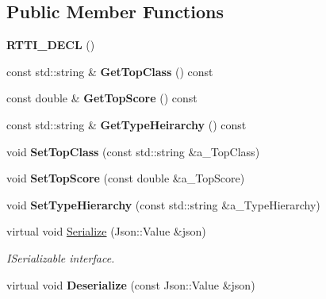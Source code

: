 \subsection*{Public Member Functions}
\begin{DoxyCompactItemize}
\item 
\mbox{\label{class_entity_aaf469281c2b86495bf400362eda6ef57}} 
{\bfseries R\+T\+T\+I\+\_\+\+D\+E\+CL} ()
\item 
\mbox{\label{class_entity_aa4b1144ee0a85240c58268bab6a02636}} 
const std\+::string \& {\bfseries Get\+Top\+Class} () const
\item 
\mbox{\label{class_entity_a9b114e718c3552a822a29cf0b3680fb3}} 
const double \& {\bfseries Get\+Top\+Score} () const
\item 
\mbox{\label{class_entity_a9de188785e8ec974fd587963b181f0fd}} 
const std\+::string \& {\bfseries Get\+Type\+Heirarchy} () const
\item 
\mbox{\label{class_entity_acb89eda6c2d05419ff158c54ad82afb3}} 
void {\bfseries Set\+Top\+Class} (const std\+::string \&a\+\_\+\+Top\+Class)
\item 
\mbox{\label{class_entity_a88c543a1bb48ca08676d992e521da246}} 
void {\bfseries Set\+Top\+Score} (const double \&a\+\_\+\+Top\+Score)
\item 
\mbox{\label{class_entity_aaf6a72657088c2848e4f6c257d3d04d7}} 
void {\bfseries Set\+Type\+Hierarchy} (const std\+::string \&a\+\_\+\+Type\+Hierarchy)
\item 
\mbox{\label{class_entity_af6d9b40f72df44d26108e44a94ca3be0}} 
virtual void \hyperlink{class_entity_af6d9b40f72df44d26108e44a94ca3be0}{Serialize} (Json\+::\+Value \&json)
\begin{DoxyCompactList}\small\item\em I\+Serializable interface. \end{DoxyCompactList}\item 
\mbox{\label{class_entity_aa26ea4f3da292a6903d54a0482ad5136}} 
virtual void {\bfseries Deserialize} (const Json\+::\+Value \&json)
\end{DoxyCompactItemize}
